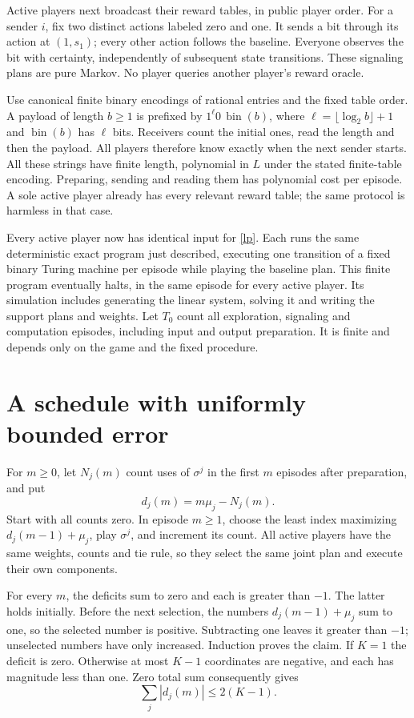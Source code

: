 \documentclass[11pt]{article}
\begin{document}
Active players next broadcast their reward tables, in public player
order. For a sender $i$, fix two distinct actions labeled zero and one.
It sends a bit through its action at $(1,s_1)$; every other action follows
the baseline. Everyone observes the bit with certainty, independently
of subsequent state transitions. These signaling plans are pure Markov.
No player queries another player's reward oracle.

Use canonical finite binary encodings of rational entries and the fixed
table order. A payload of length $b\geq1$ is prefixed by
$1^\ell0\,\operatorname{bin}(b)$, where
$\ell=\lfloor\log_2 b\rfloor+1$ and $\operatorname{bin}(b)$ has $\ell$
bits. Receivers count the initial ones, read the length and then the
payload. All players therefore know exactly when the next sender starts.
All these strings have finite length, polynomial in $L$ under the stated
finite-table encoding. Preparing, sending and reading them has
polynomial cost per episode. A sole active player already has every
relevant reward table; the same protocol is harmless in that case.

Every active player now has identical input for \eqref{lp}. Each runs
the same deterministic exact program just described, executing one
transition of a fixed binary Turing machine per episode while playing
the baseline plan. This finite program eventually halts, in the same
episode for every active player. Its simulation includes generating the
linear system, solving it and writing the support plans and weights.
Let $T_0$ count all exploration, signaling and computation episodes,
including input and output preparation. It is finite and depends only
on the game and the fixed procedure.

\section{A schedule with uniformly bounded error}
For $m\geq0$, let $N_j(m)$ count uses of $\sigma^j$ in the first $m$
episodes after preparation, and put
\[
                     d_j(m)=m\mu_j-N_j(m).
\]
Start with all counts zero. In episode $m\geq1$, choose the least index
maximizing $d_j(m-1)+\mu_j$, play $\sigma^j$, and increment its count.
All active players have the same weights, counts and tie rule, so they
select the same joint plan and execute their own components.

For every $m$, the deficits sum to zero and each is greater than $-1$.
The latter holds initially. Before the next selection, the numbers
$d_j(m-1)+\mu_j$ sum to one, so the selected number is positive.
Subtracting one leaves it greater than $-1$; unselected numbers have
only increased. Induction proves the claim. If $K=1$ the deficit is zero.
Otherwise at most $K-1$ coordinates are negative, and each has magnitude
less than one. Zero total sum consequently gives
\begin{equation}\label{discrepancy}
                       \sum_j|d_j(m)|\leq2(K-1).
\end{equation}
\end{document}
